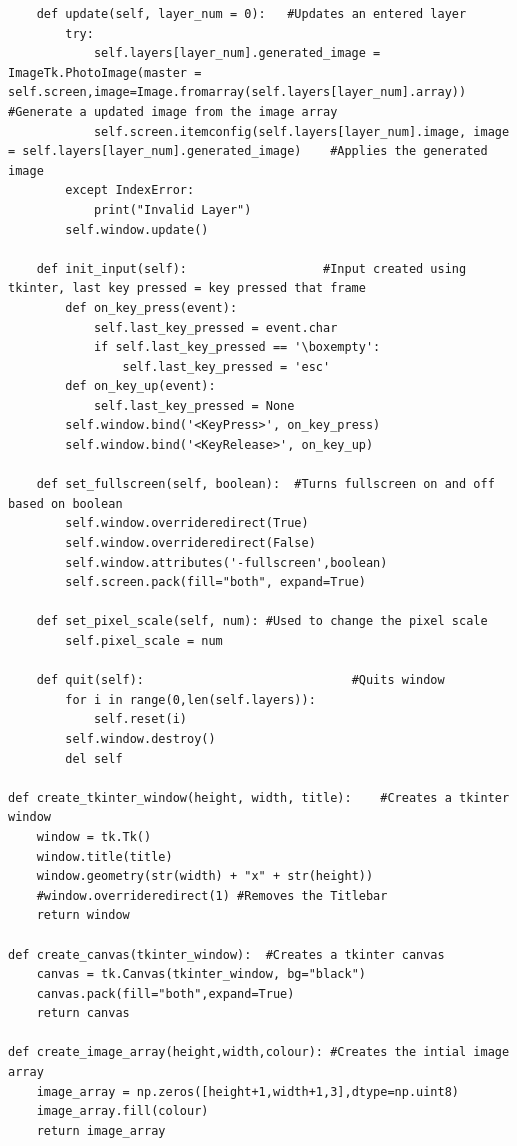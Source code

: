 \documentclass{article}
\begin{document}
\begin{lstlisting}
    def update(self, layer_num = 0):   #Updates an entered layer
        try:
            self.layers[layer_num].generated_image = ImageTk.PhotoImage(master = self.screen,image=Image.fromarray(self.layers[layer_num].array)) #Generate a updated image from the image array
            self.screen.itemconfig(self.layers[layer_num].image, image = self.layers[layer_num].generated_image)    #Applies the generated image
        except IndexError:
            print("Invalid Layer")
        self.window.update()

    def init_input(self):                   #Input created using tkinter, last key pressed = key pressed that frame
        def on_key_press(event):
            self.last_key_pressed = event.char
            if self.last_key_pressed == '\boxempty':
                self.last_key_pressed = 'esc'
        def on_key_up(event):
            self.last_key_pressed = None
        self.window.bind('<KeyPress>', on_key_press)
        self.window.bind('<KeyRelease>', on_key_up)

    def set_fullscreen(self, boolean):  #Turns fullscreen on and off based on boolean
        self.window.overrideredirect(True)
        self.window.overrideredirect(False)
        self.window.attributes('-fullscreen',boolean)
        self.screen.pack(fill="both", expand=True)

    def set_pixel_scale(self, num): #Used to change the pixel scale
        self.pixel_scale = num

    def quit(self):                             #Quits window
        for i in range(0,len(self.layers)):
            self.reset(i)
        self.window.destroy()
        del self

def create_tkinter_window(height, width, title):    #Creates a tkinter window
    window = tk.Tk()
    window.title(title)
    window.geometry(str(width) + "x" + str(height))
    #window.overrideredirect(1) #Removes the Titlebar
    return window

def create_canvas(tkinter_window):  #Creates a tkinter canvas
    canvas = tk.Canvas(tkinter_window, bg="black")
    canvas.pack(fill="both",expand=True)
    return canvas

def create_image_array(height,width,colour): #Creates the intial image array
    image_array = np.zeros([height+1,width+1,3],dtype=np.uint8)
    image_array.fill(colour)
    return image_array
\end{lstlisting}


\clearpage
\end{document}
